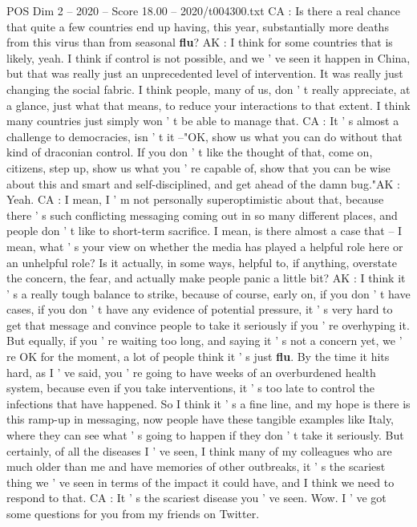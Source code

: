 \begin{textsample}{POS Dim 2 – 2020 – Score 18.00 – 2020/t004300.txt}
CA : Is there a real chance that quite a few countries end up having, this year, substantially more deaths from this virus than from seasonal \textbf{flu}?
AK : I think for some countries that is likely, yeah.
I think if control is not possible, and we ' ve seen it happen in China, but that was really just an unprecedented level of intervention.
It was really just changing the social fabric.
I think people, many of us, don ' t really appreciate, at a glance, just what that means, to reduce your interactions to that extent.
I think many countries just simply won ' t be able to manage that.
CA : It ' s almost a challenge to democracies, isn ' t it --"OK, show us what you can do without that kind of draconian control.
If you don ' t like the thought of that, come on, citizens, step up, show us what you ' re capable of, show that you can be wise about this and smart and self-disciplined, and get ahead of the damn bug."AK : Yeah.
CA : I mean, I ' m not personally superoptimistic about that, because there ' s such conflicting messaging coming out in so many different places, and people don ' t like to short-term sacrifice.
I mean, is there almost a case that -- I mean, what ' s your view on whether the media has played a helpful role here or an unhelpful role?
Is it actually, in some ways, helpful to, if anything, overstate the concern, the fear, and actually make people panic a little bit?
AK : I think it ' s a really tough balance to strike, because of course, early on, if you don ' t have cases, if you don ' t have any evidence of potential pressure, it ' s very hard to get that message and convince people to take it seriously if you ' re overhyping it.
But equally, if you ' re waiting too long, and saying it ' s not a concern yet, we ' re OK for the moment, a lot of people think it ' s just \textbf{flu}.
By the time it hits hard, as I ' ve said, you ' re going to have weeks of an overburdened health system, because even if you take interventions, it ' s too late to control the infections that have happened.
So I think it ' s a fine line, and my hope is there is this ramp-up in messaging, now people have these tangible examples like Italy, where they can see what ' s going to happen if they don ' t take it seriously.
But certainly, of all the diseases I ' ve seen, I think many of my colleagues who are much older than me and have memories of other outbreaks, it ' s the scariest thing we ' ve seen in terms of the impact it could have, and I think we need to respond to that.
CA : It ' s the scariest disease you ' ve seen.
Wow.
I ' ve got some questions for you from my friends on Twitter.

\end{textsample}

